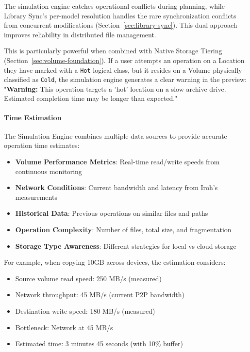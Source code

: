 \documentclass[sigconf]{acmart}
\begin{document}
The simulation engine catches operational conflicts during planning, while Library Sync's per-model resolution handles the rare synchronization conflicts from concurrent modifications (Section~\ref{sec:library-sync}). This dual approach improves reliability in distributed file management.

This is particularly powerful when combined with Native Storage Tiering (Section~\ref{sec:volume-foundation}). If a user attempts an operation on a Location they have marked with a \texttt{Hot} logical class, but it resides on a Volume physically classified as \texttt{Cold}, the simulation engine generates a clear warning in the preview: "\textbf{Warning:} This operation targets a 'hot' location on a slow archive drive. Estimated completion time may be longer than expected."

\paragraph{Time Estimation}
The Simulation Engine combines multiple data sources to provide accurate operation time estimates:

\begin{itemize}
    \item \textbf{Volume Performance Metrics}: Real-time read/write speeds from continuous monitoring
    \item \textbf{Network Conditions}: Current bandwidth and latency from Iroh's measurements
    \item \textbf{Historical Data}: Previous operations on similar files and paths
    \item \textbf{Operation Complexity}: Number of files, total size, and fragmentation
    \item \textbf{Storage Type Awareness}: Different strategies for local vs cloud storage
\end{itemize}

For example, when copying 10GB across devices, the estimation considers:
\begin{itemize}
    \item Source volume read speed: 250 MB/s (measured)
    \item Network throughput: 45 MB/s (current P2P bandwidth)
    \item Destination write speed: 180 MB/s (measured)
    \item Bottleneck: Network at 45 MB/s
    \item Estimated time: 3 minutes 45 seconds (with 10\% buffer)
\end{itemize}
\end{document}
